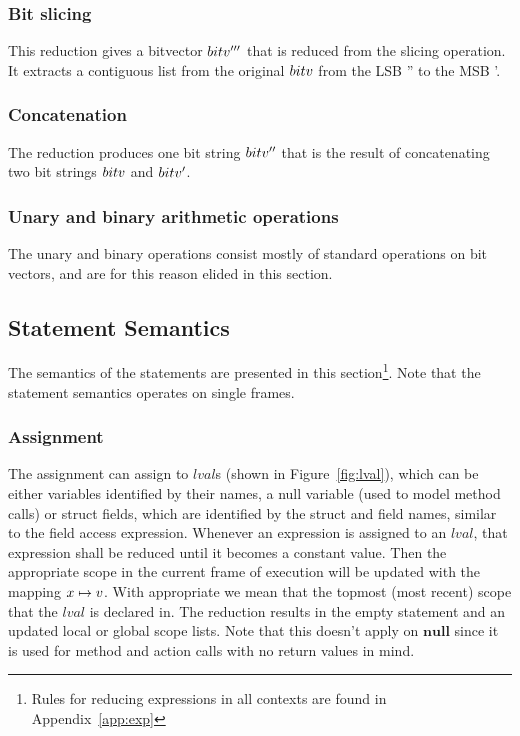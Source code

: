 \documentclass[UTF8]{article}
\begin{document}
\subsubsection*{Bit slicing}
This reduction gives a bitvector $bitv'''$ that is reduced from the slicing operation. It extracts a contiguous list from the original $bitv$ from the LSB \bitv'' to the MSB \bitv'.

\begin{figure}[ht!]
    \ottusedrule{\ottdruleeXXsliceXXv{}}
\end{figure}


\subsubsection*{Concatenation}
The reduction produces one bit string $bitv''$ that is the result of concatenating two bit strings $bitv$ and $bitv'$.

\begin{figure}[ht!]
    \ottusedrule{\ottdruleeXXconcatXXv{}}
\end{figure}


\subsubsection*{Unary and binary arithmetic operations}
The unary and binary operations consist mostly of standard operations on bit vectors, and are for this reason elided in this section.


\subsection{Statement Semantics}
The semantics of the statements are presented in this section\footnote{Rules for reducing expressions in all contexts are found in Appendix~\ref{app:exp}}. Note that the statement semantics operates on single frames.


\subsubsection*{Assignment}
The assignment can assign to $lval$s (shown in Figure~\ref{fig:lval}), which can be either variables identified by their names, a null variable (used to model method calls) or struct fields, which are identified by the struct and field names, similar to the field access expression. Whenever an expression is assigned to an $lval$, that expression shall be reduced until it becomes a constant value. Then the appropriate scope in the current frame of execution will be updated with the mapping  $x \mapsto v$. With appropriate we mean that the topmost (most recent) scope that the $lval$ is declared in. The reduction results in the empty statement and an updated local or global scope lists. Note that this doesn't apply on $\mathbf{null}$ since it is used for method and action calls with no return values in mind.
\end{document}
